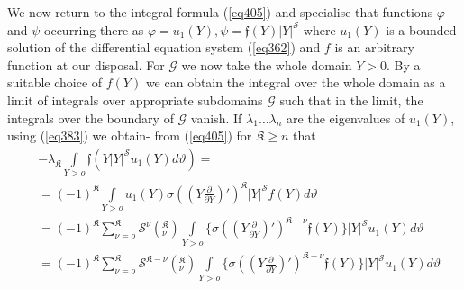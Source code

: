 We now return to the integral formula (\ref{eq405}) and specialise that
functions $\varphi$ and $\psi$ occurring there as $\varphi = u_1 (Y),
\psi = \mathfrak{f}(Y) |Y|^\mathscr{S}$ where $u_1 (Y)$ is a bounded
solution of the differential equation system (\ref{eq362}) and $f$ is an
arbitrary function at our disposal. For $\mathscr{G}$ we now take the
whole domain $Y > 0$. By a suitable choice of $f (Y)$ we can obtain
the integral over the whole domain as a limit of integrals over
appropriate subdomains $\mathscr{G}$ such that in the limit, the
integrals over the boundary of $\mathscr{G}$ vanish. If $\lambda_1
\dots \lambda_n$ are the eigenvalues of $u_1 (Y)$, using (\ref{eq383}) we
obtain- from (\ref{eq405}) for $\mathfrak{K} \ge n$ that  
\begin{align*}
& -\lambda_\mathfrak{K} \int\limits_{ Y > o } \mathfrak{f} (Y
  |Y|^\mathscr{S} u_1 (Y) d \vartheta) =\\ 
& = (-1)^\mathfrak{K} \int\limits_{Y > o} u_1 (Y) \sigma ((Y
  \frac{\partial} {\partial Y})')^\mathfrak{K} |Y|^\mathscr{S} f (Y) d
  \vartheta\\ 
& = (-1)^\mathfrak{K} \sum_{\nu = o}^\mathfrak{K} \mathscr{S}^\nu
  (^\mathfrak{K}_\nu) \int\limits_{ Y > o} \{ \sigma ((Y
  \frac{\partial}{\partial Y})')^{\mathfrak{K}-\nu} \mathfrak{f} (Y) \}
  |Y|^\mathscr{S} u_1 (Y) d \vartheta\\ 
& = (-1)^\mathfrak{K} \sum_{\nu = o}^\mathfrak{K}
  \mathscr{S}^{\mathfrak{K}-\nu} (^\mathfrak{K}_\nu) \int\limits_{ Y > o} \{
  \sigma ((Y \frac{\partial}{\partial Y})')^{\mathfrak{K}-\nu}
  \mathfrak{f} (Y) \} |Y|^\mathscr{S} u_1 (Y) d \vartheta
  \tag{427}\label{eq427}  
\end{align*}
 

